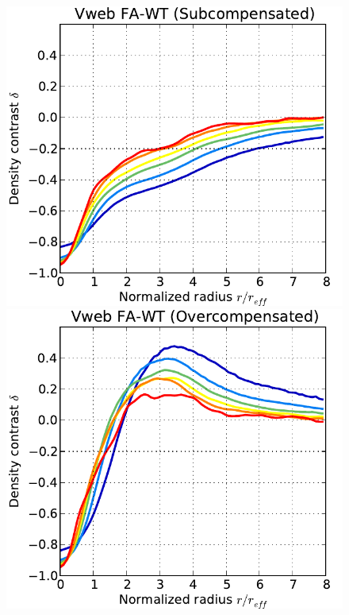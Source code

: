 \documentclass[a4,useAMS,usenatbib,usegraphicx]{mn2e}
\begin{document}
\begin{figure}
  \includegraphics[trim = 1mm 0mm 5mm 0mm, clip, keepaspectratio=true,
  width=0.32\textheight]{voids_density_VwebFAG0.pdf}
  \includegraphics[trim = 1mm 0mm 5mm 0mm, clip, keepaspectratio=true,
  width=0.32\textheight]{voids_density_VwebFAG1.pdf}

  \label{fig:density_profile}
  \vspace{0.1 cm}
\end{figure}
\end{document}
